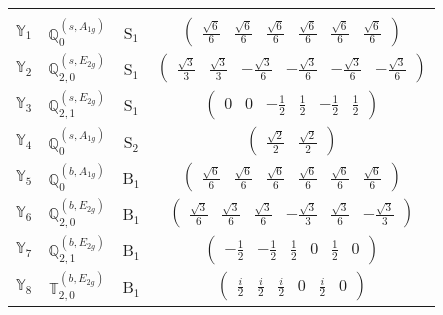 \documentclass[fleqn,10pt,landscape]{article}
\begin{document}
\begin{itemize}
\begin{center}
\begin{longtable}{c|c|c|c}
 \hline \hline
\multicolumn{3}{r}{} \\ \endlastfoot

$ \mathbb{Y}_{1} $ & $\mathbb{Q}_{0}^{(s,A_{1g})}$ & S$_{1}$ & $\begin{pmatrix} \frac{\sqrt{6}}{6} & \frac{\sqrt{6}}{6} & \frac{\sqrt{6}}{6} & \frac{\sqrt{6}}{6} & \frac{\sqrt{6}}{6} & \frac{\sqrt{6}}{6} \end{pmatrix}$ \\
$ \mathbb{Y}_{2} $ & $\mathbb{Q}_{2,0}^{(s,E_{2g})}$ & S$_{1}$ & $\begin{pmatrix} \frac{\sqrt{3}}{3} & \frac{\sqrt{3}}{3} & - \frac{\sqrt{3}}{6} & - \frac{\sqrt{3}}{6} & - \frac{\sqrt{3}}{6} & - \frac{\sqrt{3}}{6} \end{pmatrix}$ \\
$ \mathbb{Y}_{3} $ & $\mathbb{Q}_{2,1}^{(s,E_{2g})}$ & S$_{1}$ & $\begin{pmatrix} 0 & 0 & - \frac{1}{2} & \frac{1}{2} & - \frac{1}{2} & \frac{1}{2} \end{pmatrix}$ \\ \hline
$ \mathbb{Y}_{4} $ & $\mathbb{Q}_{0}^{(s,A_{1g})}$ & S$_{2}$ & $\begin{pmatrix} \frac{\sqrt{2}}{2} & \frac{\sqrt{2}}{2} \end{pmatrix}$ \\ \hline
$ \mathbb{Y}_{5} $ & $\mathbb{Q}_{0}^{(b,A_{1g})}$ & B$_{1}$ & $\begin{pmatrix} \frac{\sqrt{6}}{6} & \frac{\sqrt{6}}{6} & \frac{\sqrt{6}}{6} & \frac{\sqrt{6}}{6} & \frac{\sqrt{6}}{6} & \frac{\sqrt{6}}{6} \end{pmatrix}$ \\
$ \mathbb{Y}_{6} $ & $\mathbb{Q}_{2,0}^{(b,E_{2g})}$ & B$_{1}$ & $\begin{pmatrix} \frac{\sqrt{3}}{6} & \frac{\sqrt{3}}{6} & \frac{\sqrt{3}}{6} & - \frac{\sqrt{3}}{3} & \frac{\sqrt{3}}{6} & - \frac{\sqrt{3}}{3} \end{pmatrix}$ \\
$ \mathbb{Y}_{7} $ & $\mathbb{Q}_{2,1}^{(b,E_{2g})}$ & B$_{1}$ & $\begin{pmatrix} - \frac{1}{2} & - \frac{1}{2} & \frac{1}{2} & 0 & \frac{1}{2} & 0 \end{pmatrix}$ \\
$ \mathbb{Y}_{8} $ & $\mathbb{T}_{2,0}^{(b,E_{2g})}$ & B$_{1}$ & $\begin{pmatrix} \frac{i}{2} & \frac{i}{2} & \frac{i}{2} & 0 & \frac{i}{2} & 0 \end{pmatrix}$ \\

\end{longtable}
\end{center}
\end{itemize}
\end{document}
